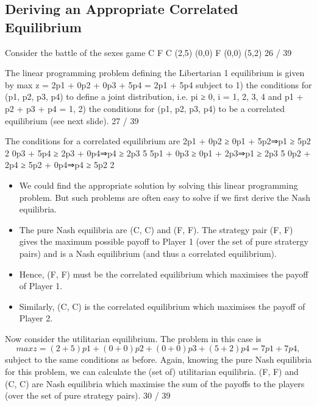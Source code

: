 \documentclass[]{report}
\begin{document}
\subsection{Deriving an Appropriate Correlated Equilibrium}
Consider the battle of the sexes game
C F
C (2,5) (0,0)
F (0,0) (5,2)
26 / 39

The linear programming problem defining the Libertarian 1
equilibrium is given by
max z = 2p1 + 0p2 + 0p3 + 5p4 = 2p1 + 5p4
subject to
1) the conditions for (p1, p2, p3, p4) to define a joint distribution,
i.e. pi ≥ 0, i = 1, 2, 3, 4 and p1 + p2 + p3 + p4 = 1,
2) the conditions for (p1, p2, p3, p4) to be a correlated equilibrium
(see next slide).
27 / 39

The conditions for a correlated equilibrium are
2p1 + 0p2 ≥ 0p1 + 5p2⇒p1 ≥
5p2
2
0p3 + 5p4 ≥ 2p3 + 0p4⇒p4 ≥
2p3
5
5p1 + 0p3 ≥ 0p1 + 2p3⇒p1 ≥
2p3
5
0p2 + 2p4 ≥ 5p2 + 0p4⇒p4 ≥
5p2
2

\begin{itemize}
	\item We could find the appropriate solution by solving this linear
	programming problem. But such problems are often easy to solve if
	we first derive the Nash equilibria.
	\item	The pure Nash equilibria are (C, C) and (F, F). The strategy pair
	(F, F) gives the maximum possible payoff to Player 1 (over the set
	of pure stratergy pairs) and is a Nash equilibrium (and thus a
	correlated equilibrium).
	\item	Hence, (F, F) must be the correlated equilibrium which maximises
	the payoff of Player 1.
	\item	Similarly, (C, C) is the correlated equilibrium which maximises the
	payoff of Player 2.
\end{itemize}


Now consider the utilitarian equilibrium. The problem in this case
is
\[max z = (2 + 5)p1 + (0 + 0)p2 + (0 + 0)p3 + (5 + 2)p4 = 7p1 + 7p4,\]
subject to the same conditions as before.
Again, knowing the pure Nash equilibria for this problem, we can
calculate the (set of) utilitarian equilibria.
(F, F) and (C, C) are Nash equilibria which maximise the sum of
the payoffs to the players (over the set of pure strategy pairs).
30 / 39
\end{document}
